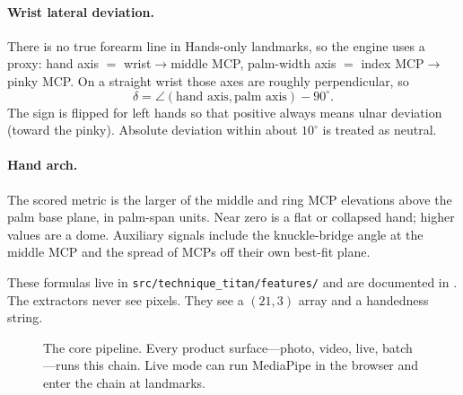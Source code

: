 \documentclass[11pt,a4paper]{article}
\newcommand{\code}[1]{\texttt{#1}}
\begin{document}
\paragraph{Wrist lateral deviation.}
There is no true forearm line in Hands-only landmarks, so the engine uses a proxy: hand axis \(=\) wrist\(\to\)middle MCP, palm-width axis \(=\) index MCP\(\to\)pinky MCP.
On a straight wrist those axes are roughly perpendicular, so
\begin{equation}
  \delta = \angle(\text{hand axis}, \text{palm axis}) - 90^\circ.
\end{equation}
The sign is flipped for left hands so that positive always means ulnar deviation (toward the pinky).
Absolute deviation within about \(10^\circ\) is treated as neutral.

\paragraph{Hand arch.}
The scored metric is the larger of the middle and ring MCP elevations above the palm base plane, in palm-span units.
Near zero is a flat or collapsed hand; higher values are a dome.
Auxiliary signals include the knuckle-bridge angle at the middle MCP and the spread of MCPs off their own best-fit plane.

These formulas live in \code{src/technique\_titan/features/} and are documented in \cite{scoringmethods}.
The extractors never see pixels.
They see a \((21,3)\) array and a handedness string.

\begin{figure}[ht]
\centering
{}
\caption{The core pipeline. Every product surface---photo, video, live, batch---runs this chain. Live mode can run MediaPipe in the browser and enter the chain at landmarks.}
\label{fig:pipeline}
\end{figure}
\end{document}

